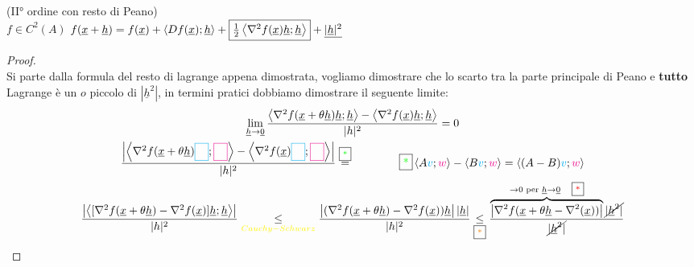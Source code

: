 \documentclass[a4paper, oneside]{article}
\begin{document}
        \begin{theorem}
            (II° ordine con resto di Peano)\\
         $f \in C^2(A)$  $f(\underline{x}+ \underline{h}) = f(\underline{x}) + \left\langle Df(\underline{x}); \underline{h} \right\rangle + \text{\fbox{$\frac{1}{2}\left\langle \nabla^2f(\underline{x})\underline{h};\underline{h} \right\rangle $}} + \underline{ | \underline{h} | ^2}$ 
        \end{theorem}
        \begin{proof}\hfill\\
            Si parte dalla formula del resto di lagrange appena dimostrata, vogliamo dimostrare che lo scarto tra la parte principale di Peano e \textbf{tutto} Lagrange è un $o$ piccolo di $|\underline{h}^2|$, in termini pratici dobbiamo dimostrare il seguente limite:            
            \begin{gather*}
                \lim_{\underline{h} \to \underline{0}} \frac{\left\langle \nabla^2f(\underline{x} + \theta \underline{h})\underline{h} ; \underline{h} \right\rangle - \left\langle \nabla^2f(\underline{x})\underline{h} ; \underline{h} \right\rangle }{|h|^2} = 0\\
                \frac{\left\lvert \left\langle \nabla^2f(\underline{x} + \theta \underline{h}) \textcolor{cyan}{\fbox{\textcolor{white}{\underline{h}}}} ; \textcolor{magenta}{\fbox{\textcolor{white}{\underline{h}}}} \right\rangle - \left\langle \nabla^2f(\underline{x})\textcolor{cyan}{\fbox{\textcolor{white}{\underline{h}}}} ; \textcolor{magenta}{\fbox{\textcolor{white}{\underline{h}}}} \right\rangle\right\rvert  }{|h|^2} \overset{\text{\fbox{\textcolor{green}{*}}}}{=} \qquad\qquad \text{\fbox{\textcolor{green}{*}}}\left\langle  A \textcolor{cyan}{v};\textcolor{magenta}{w}\right\rangle - \left\langle B \textcolor{cyan}{v};\textcolor{magenta}{w}\right\rangle = \left\langle (A-B)\textcolor{cyan}{v};\textcolor{magenta}{w}\right\rangle\\
                \frac{\left\lvert \left\langle [\nabla^2 f(\underline{x} + \theta \underline{h}) - \nabla^2 f(\underline{x})] \underline{h} ; \underline{h} \right\rangle \right\rvert }{|h|^2} \underset{\textcolor{yellow}{Cauchy-Schwarz}}{\leq} \frac{\left\lvert (\nabla^2 f(\underline{x} + \theta \underline{h}) - \nabla^2 f(\underline{x}))  \underline{h} \right\rvert \left\lvert \underline{h}\right\rvert }{|h|^2} \underset{\text{\fbox{\textcolor{orange}{*}}}}{\leq} \frac{\overbrace{\left\lvert \nabla^2f(\underline{x}+ \theta \underline{h} - \nabla^2(\underline{x}))\right\rvert}^{\to 0 \text{ per } \underline{h} \to \underline{0} \quad \text{\fbox{\textcolor{red}{*}}}} \cancel{|\underline{h}^2|}}{\cancel{|\underline{h}^2|}}\\

\end{gather*}
\end{proof}
\end{document}
